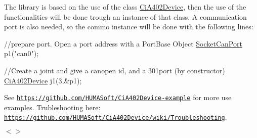 The library is based on the use of the class {\ttfamily \hyperlink{classCiA402Device}{Ci\+A402\+Device}}, then the use of the functionalities will be done trough an instance of that class. A communication port is also needed, so the commo instance will be done with the following lines\+:


\begin{DoxyCode}
\textcolor{comment}{//prepare port. Open a port address with a PortBase Object}
\hyperlink{classSocketCanPort}{SocketCanPort} p1(\textcolor{stringliteral}{"can0"});

\textcolor{comment}{//Create a joint and give a canopen id, and a 301port (by constructor)}
\hyperlink{classCiA402Device}{CiA402Device} j1(3,&p1);
\end{DoxyCode}


See \href{https://github.com/HUMASoft/CiA402Device-example}{\tt https\+://github.\+com/\+H\+U\+M\+A\+Soft/\+Ci\+A402\+Device-\/example} for more use examples. Trubleshooting here\+: \href{https://github.com/HUMASoft/CiA402Device/wiki/Troubleshooting}{\tt https\+://github.\+com/\+H\+U\+M\+A\+Soft/\+Ci\+A402\+Device/wiki/\+Troubleshooting}.

$<$$>$ 